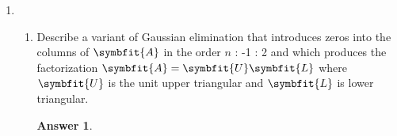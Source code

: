 \documentclass{article}
\theoremstyle{definition}
\newtheorem*{answer}{Answer}
\newcommand{\mat}[1]{\symbfit{#1}}
\begin{document}
\begin{enumerate}[leftmargin=\labelsep]
\begin{proof}
\begin{align*}
			                       & = \cancel{\qty(\mat{A}^{\top}\mat{A})^{-1}}\cancel{\qty(\mat{A}^{\top}\mat{A}) } \\
			                       & = \mat{I},
		      \end{align*}
		      and
		      \begin{align*}
			      (\mat{A}^+\mat{A})^\top & = \mat{A}^{\top} (\mat{A}^+)^{\top}                                                \\
			                              & = \mat{A}^{\top} (\qty(\mat{A}^{\top}\mat{A})^{-1}\mat{A}^{\top})^{\top}           \\
			                              & = \mat{A}^{\top} \mat{A} \qty(\qty(\mat{A}^{\top}\mat{A})^{-1})^{\top}             \\
			                              & = \mat{A}^{\top} \mat{A} \qty(\qty(\mat{A}^{\top}\mat{A})^{\top})^{-1}             \\
			                              & = \cancel{\qty(\mat{A}^{\top} \mat{A})} \cancel{\qty(\mat{A}^{\top} \mat{A})^{-1}} \\
			                              & = \mat{I},
		      \end{align*}
		      so \(\mat{A}^+\mat{A}= (\mat{A}^+\mat{A})^\top\).
		      Finally,
		      \begin{align*}
			      (\mat{A}\mat{A}^+)^\top & = \qty(\mat{A}^+)^{\top}\mat{A}^\top                                  \\
			                              & = (\qty(\mat{A}^{\top}\mat{A})^{-1}\mat{A}^{\top})^{\top}\mat{A}^\top \\
			                              & = \mat{A}\qty(\qty(\mat{A}^{\top}\mat{A})^{-1})^{\top}\mat{A}^\top    \\
			                              & = \mat{A}\qty(\qty(\mat{A}^{\top}\mat{A})^{\top})^{-1}\mat{A}^\top    \\
			                              & = \mat{A}\qty(\mat{A}^{\top}\mat{A})^{-1}\mat{A}^\top                 \\
			                              & =\mat{A}\mat{A}^+.
		      \end{align*}
	      \end{proof}

	\item
	      \begin{enumerate}
		      \item Describe a variant of Gaussian elimination that introduces zeros into the columns of \(\mat{A}\) in the order \(n\) : -1 : 2 and which produces the factorization \(\mat{A} = \mat{U}\mat{L}\) where \(\mat{U}\) is the unit upper triangular and \(\mat{L}\) is lower triangular.
		            \begin{answer}
		            \end{answer}


\end{enumerate}
\end{enumerate}
\end{document}
